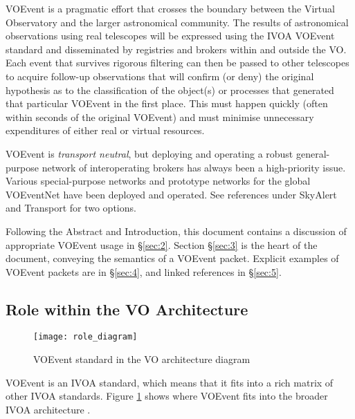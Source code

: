 \documentclass[11pt,a4paper]{ivoa}
\begin{document}
VOEvent is a pragmatic effort that crosses the boundary between the Virtual
Observatory and the larger astronomical community. The results of astronomical
observations using real telescopes will be expressed using the IVOA VOEvent
standard and disseminated by registries and brokers within and outside the VO.
Each event that survives rigorous filtering can then be passed to other
telescopes to acquire follow-up observations that will confirm (or deny) the
original hypothesis as to the classification of the object(s) or processes that
generated that particular VOEvent in the first place. This must happen quickly
(often within seconds of the original VOEvent) and must minimise unnecessary
expenditures of either real or virtual resources.

VOEvent is \emph{transport neutral}, but deploying and operating a robust
general-purpose network of interoperating brokers has always been a
high-priority issue. Various special-purpose networks and prototype networks
for the global VOEventNet have been deployed and operated. See references under
SkyAlert \citep{bib05} and Transport \citep{bib33} for two options.

Following the Abstract and Introduction, this document contains a discussion of
appropriate VOEvent usage in \S\ref{sec:2}. Section \S\ref{sec:3} is the heart
of the document, conveying the semantics of a VOEvent packet. Explicit examples
of VOEvent packets are in \S\ref{sec:4}, and linked references in \S\ref{sec:5}.

\subsection{Role within the VO Architecture}

\begin{figure}[ht!]
\centering\texttt{[image: role\_diagram]}
\caption{VOEvent standard in the VO architecture diagram}
\label{fig:diagram}
\end{figure}

VOEvent is an IVOA standard, which means that it fits into a rich matrix of
other IVOA standards. Figure \ref{fig:diagram} shows where VOEvent fits into
the broader IVOA architecture \citep{2021ivoa.spec.1101D}.
\end{document}
